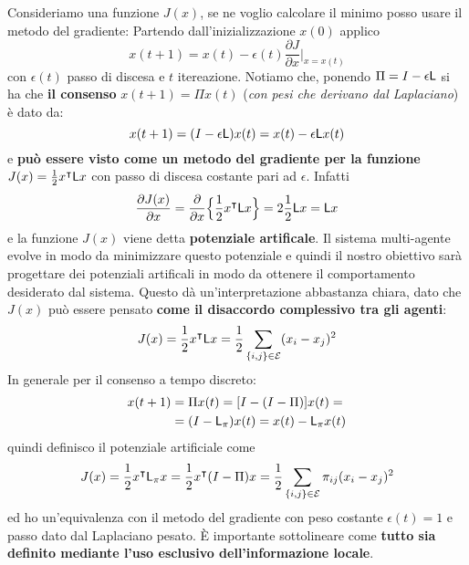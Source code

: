 Consideriamo una funzione $J(x)$, se ne voglio calcolare il minimo posso usare il metodo del gradiente:
Partendo dall'inizializzazione $x(0)$ applico
\begin{equation}
x(t+1) = x(t) - \epsilon(t) \frac{\partial J}{\partial x} \Big | _{x=x(t)}
\end{equation} con $\epsilon(t)$ passo di discesa e $t$ itereazione. Notiamo che, ponendo $\Pi = I - \epsilon \mathsf{L}$ si ha che \textbf{il consenso} $x(t+1) = \Pi x(t)$ (\textit{con pesi che derivano dal Laplaciano}) \`e dato da:
\begin{equation}
x(t+1) = (I - \epsilon \mathsf{L})x(t) = x(t) - \epsilon \mathsf{L} x(t)
\end{equation} e \textbf{pu\`o essere visto come un metodo del gradiente per la funzione} $J(x) = \frac{1}{2} x^\intercal  \mathsf{L} x$ con passo di discesa costante pari ad $\epsilon$. Infatti
\begin{equation}
\frac{\partial J (x)}{\partial x} = \frac{\partial}{\partial x} \Big \{ \frac{1}{2} x^\intercal  \mathsf{L} x \Big \} = 2 \frac{1}{2} \mathsf{L} x = \mathsf{L} x
\end{equation} e la funzione $J(x)$ viene detta \textbf{potenziale artificale}. Il sistema multi-agente evolve in modo da minimizzare questo potenziale e quindi il nostro obiettivo sar\`a progettare dei potenziali artificali in modo da ottenere il comportamento desiderato dal sistema. Questo d\`a un'interpretazione abbastanza chiara, dato che $J(x)$ pu\`o essere pensato \textbf{come il disaccordo complessivo tra gli agenti}:
\begin{equation}
J(x) = \frac{1}{2} x^\intercal  \mathsf{L} x = \frac{1}{2} \sum_{\{i,j\} \in \mathcal{E}} (x_i - x_j)^2
\end{equation} In generale per il consenso a tempo discreto:
\begin{align*}
x(t+1) &= \Pi x(t) = [I - (I-\Pi)]x(t) = \\
&= (I - \mathsf{L}_{\pi}) x(t) = x(t) - \mathsf{L}_{\pi} x(t)
\end{align*} quindi definisco il potenziale artificiale come 
\begin{equation}
J(x) = \frac{1}{2} x^\intercal  \mathsf{L}_{\pi} x = \frac{1}{2} x^\intercal  (I - \Pi) x = \frac{1}{2} \sum_{\{i,j\} \in \mathcal{E}} \pi_{ij} (x_i - x_j)^2
\end{equation} ed ho un'equivalenza con il metodo del gradiente con peso costante $\epsilon(t)=1$ e passo dato dal Laplaciano pesato. \`E importante sottolineare come \textbf{tutto sia definito mediante l'uso esclusivo dell'informazione locale}.

